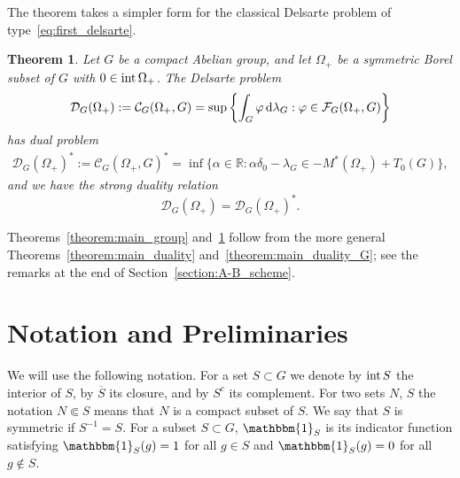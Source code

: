 \documentclass[[a4paper,english,12pt]{amsart}
\theoremstyle{plain}
\newtheorem{theorem}{Theorem}
\theoremstyle{remark}
\newcommand{\intt}{\mbox{\rm int\,}}
\newcommand{\RR}{\mathbb R}
\begin{document}
The theorem takes a simpler form for the classical Delsarte problem of type~\eqref{eq:first_delsarte}.

\begin{theorem} \label{theorem:main_group_G}
Let $G$ be a compact Abelian group, and let $\Omega_+$ be a symmetric Borel subset of $G$ with $0 \in \intt{\Omega_+}$. The Delsarte problem 
\begin{equation*}
\mathcal{D}_G(\Omega_+) := \mathcal{C}_G(\Omega_+, G) = \sup \left\{ \int_G \varphi \,\textup{d}\lambda_G : \varphi \in \mathcal{F}_G(\Omega_+, G) \right\}
\end{equation*}
has dual problem
\begin{align*}
\mathcal{D}_G(\Omega_+)^* := \mathcal{C}_{G}(\Omega_+, G)^{*} = \inf \{ \alpha \in \RR : \alpha \delta_0 - \lambda_G \in - M^*(\Omega_+) + T_0(G)\},
\end{align*}
and we have the strong duality relation
\begin{equation*}
    \mathcal{D}_G(\Omega_+) = \mathcal{D}_G(\Omega_+)^*.
\end{equation*}

\end{theorem}

Theorems~\ref{theorem:main_group} and~\ref{theorem:main_group_G} follow from the more general Theorems~\ref{theorem:main_duality} and~\ref{theorem:main_duality_G}; see the remarks at the end of Section~\ref{section:A-B_scheme}.

\section{Notation and Preliminaries} \label{section:notation}

We will use the following notation. For a set $S \subset G$ we denote by $\intt{S}$ the interior of $S$, by $\overline{S}$ its closure, and by $S^c$ its complement. For two sets $N$, $S$ the notation $N \Subset S$ means that $N$ is a compact subset of $S$. We say that $S$ is symmetric if $S^{-1} = S$. For a subset \(S\subset G\), \(\mathbbm{1}_{S}\) is its indicator function satisfying \(\mathbbm{1}_S(g) = 1\) for all \(g \in S\) and \(\mathbbm{1}_ S(g) = 0\) for all \(g \notin S\).
\end{document}
